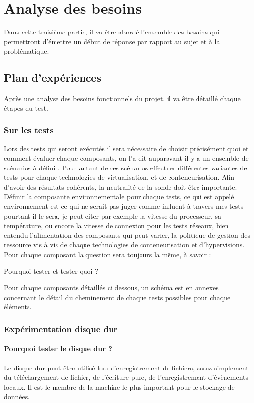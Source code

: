\chapter{Analyse des besoins}

Dans cette troisième partie, il va être abordé l'ensemble des besoins qui permettront d'émettre un début de réponse par rapport au sujet et à la problématique.


\section{Plan d'expériences}

Après une analyse des besoins fonctionnels du projet, il va être détaillé chaque étapes du test.

\subsection{Sur les tests}
Lors des tests qui seront exécutés il sera nécessaire de choisir précisément quoi et comment évaluer chaque composants, on l'a dit auparavant il y a un ensemble de scénarios à définir. Pour autant de ces scénarios effectuer différentes variantes de tests pour chaque 
technologies de virtualisation, et de conteneurisation. Afin d'avoir des résultats cohérents, la neutralité de la sonde doit être importante. Définir la composante environnementale pour chaque tests, ce qui est appelé environnement est ce qui ne serait pas juger comme influent à travers mes tests pourtant il le sera, je peut citer par exemple la vitesse du processeur, sa température, ou encore la vitesse de connexion pour les tests réseaux, bien entendu l'alimentation des composants qui peut varier, la politique de gestion des ressource vis à vis de chaque technologies de conteneurisation et d’hypervisions.
Pour chaque composant la question sera toujours la même, à savoir : 
\begin{center}
Pourquoi tester et tester quoi ?
\end{center} 
Pour chaque composants détaillés ci dessous, un schéma est en annexes concernant le détail du cheminement de chaque tests possibles pour chaque éléments.
\subsection{Expérimentation disque dur}
\subsubsection{Pourquoi tester le disque dur ? }
Le disque dur peut être utilisé lors d'enregistrement de fichiers, assez simplement du téléchargement de fichier, de l’écriture pure, de l'enregistrement d'évènements locaux. Il est le membre de la machine le plus important pour le stockage de données.
